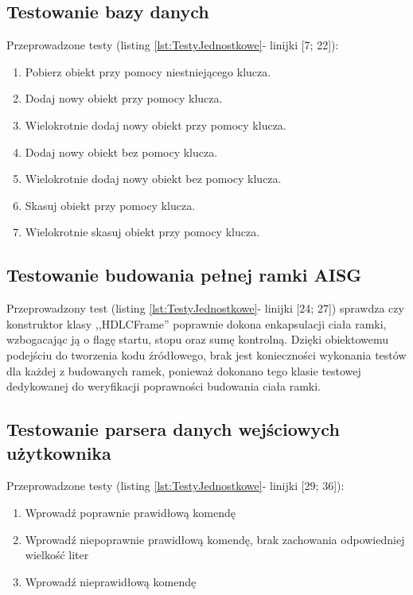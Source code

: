     \subsection{Testowanie bazy danych}
    \label{sec:TestowanieBazyDanych}
        Przeprowadzone testy (listing \ref{lst:TestyJednostkowe}- linijki [7; 22]):
        \begin{enumerate}
            \item Pobierz obiekt przy pomocy niestniejącego klucza.
            \item Dodaj nowy obiekt przy pomocy klucza.
            \item Wielokrotnie dodaj nowy obiekt przy pomocy klucza.
            \item Dodaj nowy obiekt bez pomocy klucza.
            \item Wielokrotnie dodaj nowy obiekt bez pomocy klucza.
            \item Skasuj obiekt przy pomocy klucza.
            \item Wielokrotnie skasuj obiekt przy pomocy klucza.
        \end{enumerate}
    \subsection{Testowanie budowania pełnej ramki AISG}
        Przeprowadzony test (listing \ref{lst:TestyJednostkowe}- linijki [24; 27]) sprawdza czy konstruktor klasy ,,HDLCFrame'' poprawnie
        dokona enkapsulacji ciała ramki, wzbogacając ją o flagę startu, stopu oraz sumę kontrolną. Dzięki obiektowemu podejściu do tworzenia kodu źródłowego, 
        brak jest konieczności wykonania testów dla każdej z budowanych ramek, ponieważ dokonano tego klasie testowej dedykowanej do weryfikacji poprawności budowania ciała ramki. 
    \subsection{Testowanie parsera danych wejściowych użytkownika}
        Przeprowadzone testy (listing \ref{lst:TestyJednostkowe}- linijki [29; 36]):
        \begin{enumerate}
            \item Wprowadź poprawnie prawidłową komendę
            \item Wprowadź niepoprawnie prawidłową komendę, brak zachowania odpowiedniej wielkość liter
            \item Wprowadź nieprawidłową komendę
        \end{enumerate}
